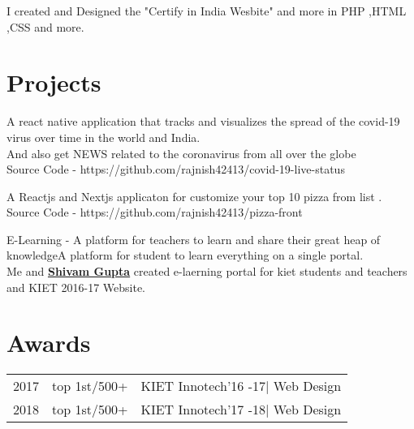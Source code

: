 \documentclass[]{deedy-resume-openfont}
\begin{document}
\begin{minipage}[t]{0.66\textwidth}
\begin{tightemize}
\item I created and Designed the "Certify in India Wesbite" and more in PHP ,HTML ,CSS and more.
\end{tightemize}
\sectionsep



\section{Projects}
A react native application that tracks and visualizes the spread of the covid-19 virus over time in the world and India.  \\
And also get NEWS related to the coronavirus from all over the globe\\
Source Code - https://github.com/rajnish42413/covid-19-live-status
\sectionsep

A Reactjs and Nextjs applicaton for customize your top 10 pizza from list . \\ 
Source Code - https://github.com/rajnish42413/pizza-front
\sectionsep

E-Learning - A platform for teachers to learn and share their great heap of knowledgeA platform for student to learn everything on a single portal. \\
Me and \textbf{\href{https://www.linkedin.com/in/shivam-gupta-js-developer/}{Shivam Gupta}} created e-laerning portal for kiet students and teachers and KIET 2016-17 Website. 
\sectionsep


\section{Awards} 
\begin{tabular}{rll}
2017	     & top 1st/500+  & KIET Innotech'16 -17| Web Design \\
2018	     & top 1st/500+  & KIET Innotech'17 -18| Web Design \\
\end{tabular}
\sectionsep

\end{minipage} 
\end{document}

